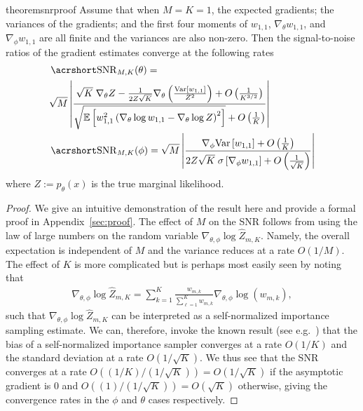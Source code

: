 \begin{restatable}{theorem}{snrproof}
	\label{the:snr}
Assume that when $M=K=1$, the expected gradients; the variances of the gradients; and the 
first four moments of  $w_{1,1}$, $\nabla_{\theta} w_{1,1}$, and 
$\nabla_{\phi} w_{1,1}$ are all finite and the variances are
also non-zero.
Then the signal-to-noise ratios of the gradient estimates converge at the following rates
\begin{align}
&\SNR_{M,K} (\theta) = 
	\label{eq:snr_theta} \\
&\sqrt{M}\left|\frac{ \sqrt{K} \; 
	\nabla_{\theta} Z -\frac{1}{2Z\sqrt{K}}\nabla_{\theta} \left(\frac{\textnormal{Var} \left[w_{1,1}\right]}{Z^2}\right)+ O\left(\frac{1}{K^{3/2}}\right) }
{\sqrt{\E \left[w_{1,1}^2\left(\nabla_{\theta} \log w_{1,1}-\nabla_{\theta} \log Z\right)^2\right]} + O\left(\frac{1}{K}\right)}\right| \nonumber \\
\label{eq:snr_phi}
& \SNR_{M,K} (\phi) =\sqrt{M} \left|\frac{
	\nabla_{\phi} \textnormal{Var} \left[w_{1,1}\right] + O\left(\frac{1}{K}\right) }
{2 Z\sqrt{K} \; \sigma\left[\nabla_{\phi} w_{1,1}\right] +O\left(\frac{1}{\sqrt{K}}\right)}\right|
\end{align}
where $Z := p_{\theta}(x)$ is the true marginal likelihood.
\end{restatable}
\begin{proof}
    We give an intuitive demonstration
	of the result here and provide a formal proof in Appendix~\ref{sec:proof}.
	The effect of $M$ on the \gls{SNR} follows from
	using the law of large
	numbers on the random variable $\nabla_{\theta, \phi} \log \hat{Z}_{m,K}$.  Namely, the 
	overall expectation is independent of $M$ and
	the variance reduces at a rate $O(1/M)$.  
	The effect of $K$ is more complicated but
	is perhaps most easily seen by noting that~\cite{Burda2016importance}
	\begin{align*}
	\nabla_{\theta, \phi} \log \hat{Z}_{m,K}
	= \sum_{k=1}^{K} \frac{w_{m,k}^{}}{\sum_{\ell=1}^{K} w_{m,k}^{}} 
	\nabla_{\theta, \phi} \log \left(w_{m,k}^{}\right),
	\end{align*}
	such that $\nabla_{\theta, \phi} \log \hat{Z}_{m,K}$ can be interpreted as a self-normalized importance sampling
	estimate.  We can, therefore, invoke the known result (see e.g.~\citet{Hesterberg1988advances}) 
	that the bias of a self-normalized
	importance sampler converges at a rate $O(1/K)$ and the standard deviation at
	a rate $O(1/\sqrt{K})$.  We thus see that the \gls{SNR} converges at a rate $O((1/K)/(1/\sqrt{K}))
	=O(1/\sqrt{K})$ if the asymptotic gradient is $0$ and $O((1)/(1/\sqrt{K}))=O(\sqrt{K})$
	otherwise, giving the convergence rates in the $\phi$ and $\theta$ cases respectively.
	\vspace{-8pt}
\end{proof}

